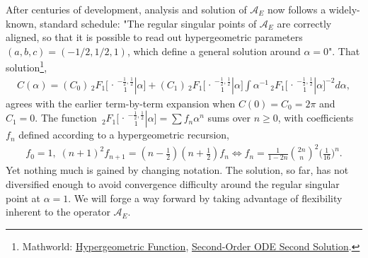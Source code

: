 \documentclass[nofootinbib,preprint]{revtex4-1}
\newcommand{\tFo}[3]{\,_2F_1 \bigg[ 
\genfrac.|{0pt}{}{#1}{#2} #3 \bigg]}
\newcommand{\tFoIn}[3]{\,_2F_1 \Big[ 
\genfrac.|{0pt}{}{#1}{#2} #3 \Big]}
\begin{document}
After centuries of development, analysis and solution of $\mathcal{A}_E$ 
now follows a widely-known, standard schedule: "The regular singular points 
of $\mathcal{A}_E$ are correctly aligned, so that it is possible to read out hypergeometric
parameters $(a,b,c)=(-1/2,1/2,1)$, which define a general solution around $\alpha=0$". 
That solution\footnote{Mathworld: 
\href{http://mathworld.wolfram.com/HypergeometricFunction.html}{Hypergeometric Function}, 
\href{http://mathworld.wolfram.com/Second-OrderOrdinaryDifferentialEquationSecondSolution.html}{Second-Order ODE Second Solution}.}, 
\begin{eqnarray}
C(\alpha) = (C_0) \tFo{-\frac{1}{2},\frac{1}{2}}{1}{\alpha} 
+ (C_1) \tFo{-\frac{1}{2},\frac{1}{2}}{1}{\alpha}\int  \alpha^{-1} 
\tFo{-\frac{1}{2},\frac{1}{2}}{1}{\alpha}^{-2} d\alpha, \nonumber
\end{eqnarray}
agrees with the earlier term-by-term expansion when $C(0)=C_0=2\pi$ and $C_1=0$. 
The function  $\tFoIn{-\frac{1}{2},\frac{1}{2}}{1}{\alpha} = \sum f_n \alpha^n$
sums over $n \ge 0$, with coefficients $f_n$ defined according to a hypergeometric 
recursion, 
\begin{eqnarray}
f_0=1, \; (n+1)^2 f_{n+1} = (n-\tfrac{1}{2})(n+\tfrac{1}{2})f_n
\iff f_n = \frac{1}{1-2n}\binom{2n}{n}^2\bigg(\frac{1}{16}\bigg)^{n}. \nonumber 
\end{eqnarray}
Yet nothing much is gained by changing notation. The solution, so far, has not 
diversified enough to avoid convergence difficulty around the regular singular 
point at $\alpha=1$. We will forge a way forward by taking advantage of flexibility 
inherent to the operator $\mathcal{A}_E$.
\end{document}
